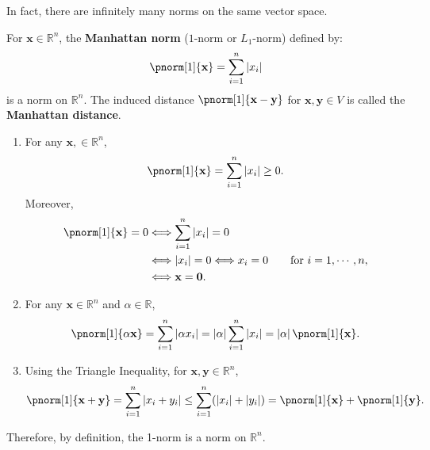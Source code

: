 \documentclass{huhtakm-template-book-v2}
\begin{document}
    \begin{rem}
        In fact, there are infinitely many norms on the same vector space.
    \end{rem}
    \begin{eg}
        For $\mathbf{x} \in \mathbb{R}^{n}$, the \textbf{Manhattan norm} ($1$-norm or $L_{1}$-norm) defined by:
        \begin{equation*}
            \pnorm[1]{\mathbf{x}} = \sum_{i=1}^{n} \abs{x_{i}}
        \end{equation*}
        is a norm on $\mathbb{R}^{n}$. The induced distance $\pnorm[1]{\mathbf{x} - \mathbf{y}}$ for $\mathbf{x}, \mathbf{y} \in V$ is called the \textbf{Manhattan distance}.
    \end{eg}
    \begin{proofing}
        \begin{enumerate}
            \item For any $\mathbf{x}, \in \mathbb{R}^{n}$,
            \begin{equation*}
                \pnorm[1]{\mathbf{x}} = \sum_{i=1}^{n} \abs{x_{i}} \geq 0.
            \end{equation*}
            Moreover,
            \begin{align*}
                \pnorm[1]{\mathbf{x}} = 0 &\Longleftrightarrow \sum_{i=1}^{n} \abs{x_{i}} = 0\\
                &\Longleftrightarrow \abs{x_{i}} = 0 \Longleftrightarrow x_{i} = 0 \qquad \text{for } i = 1, \cdots, n,\\
                &\Longleftrightarrow \mathbf{x} = \mathbf{0}.
            \end{align*}
            \item For any $\mathbf{x} \in \mathbb{R}^{n}$ and $\alpha \in \mathbb{R}$, 
            \begin{equation*}
                \pnorm[1]{\alpha \mathbf{x}} = \sum_{i=1}^{n} \abs{\alpha x_{i}} = \abs{\alpha} \sum_{i=1}^{n} \abs{x_{i}} = \abs{\alpha} \pnorm[1]{\mathbf{x}}.
            \end{equation*}
            \item Using the Triangle Inequality, for $\mathbf{x}, \mathbf{y} \in \mathbb{R}^{n}$,
            \begin{equation*}
                \pnorm[1]{\mathbf{x} + \mathbf{y}} = \sum_{i=1}^{n} \abs{x_{i} + y_{i}} \leq \sum_{i=1}^{n} (\abs{x_{i}} + \abs{y_{i}}) = \pnorm[1]{\mathbf{x}} + \pnorm[1]{\mathbf{y}}.
            \end{equation*}
        \end{enumerate}
        Therefore, by definition, the 1-norm is a norm on $\mathbb{R}^{n}$.
    \end{proofing}
    \newpage
    
\end{document}
